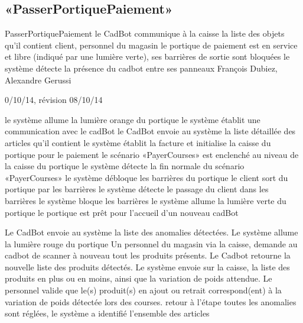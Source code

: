 ﻿%
\subsection{«PasserPortiquePaiement»}

\startCU
\nom PasserPortiquePaiement
\but le CadBot communique à la caisse la liste des objets qu'il contient
\acteur client, personnel du magasin
\precondition le portique de paiement est en service et libre (indiqué par une lumière verte), ses barrières de sortie sont bloquées
\declenchement le système détecte la présence du cadbot entre ses panneaux
\auteur François Dubiez, Alexandre Gerussi
\date 30/10/14, révision 08/10/14

\nominal %
\startnominal
\etape le système allume la lumière orange du portique
 le système établit une communication avec le cadBot
 le CadBot envoie au système la liste détaillée des articles qu'il contient
 le système établit la facture et initialise la caisse du portique pour le paiement
\etape le scénario «PayerCourses» est enclenché au niveau de la caisse du portique
\etape le système détecte la fin normale du scénario «PayerCourses»
\etape le système débloque les barrières du portique
\etape le client sort du portique par les barrières
 le système détecte le passage du client dans les barrières
 le système bloque les barrières
\etape le système allume la lumière verte du portique
\stopnominal
\postcondition le portique est prêt pour l'accueil d'un nouveau cadBot

\alternatifs %

  \etape Le CadBot envoie au système la liste des anomalies détectées.
  \etape Le système allume la lumière rouge du portique
  \etape Un personnel du magasin via la caisse, demande au cadbot de scanner à nouveau tout les produits présents.
  \etape Le Cadbot retourne la nouvelle liste des produits détectés.
  \etape Le système envoie sur la caisse, la liste des produits en plus ou en moins, ainsi que la variation de poids attendue.
   Le personnel valide que le(s) produit(s) en ajout ou retrait correspond(ent) à la variation de poids détectée lors des courses.
  \etape retour à l'étape 
\stopcondition
\postcondition toutes les anomalies sont réglées, le système a identifié l'ensemble des articles
\stopalternatif

